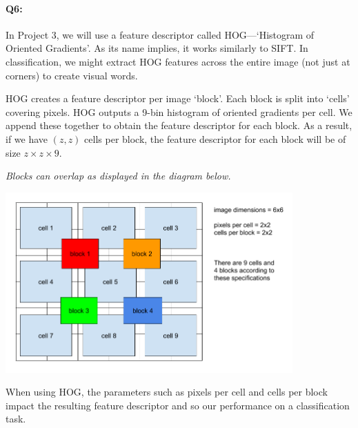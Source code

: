 \pagebreak

\paragraph{Q6:} In Project 3, we will use a feature descriptor called HOG---`Histogram of Oriented Gradients'. As its name implies, it works similarly to SIFT. In classification, we might extract HOG features across the entire image (not just at corners) to create visual words.

HOG creates a feature descriptor per image `block'. Each block is split into `cells' covering pixels. HOG outputs a 9-bin histogram of oriented gradients per cell. We append these together to obtain the feature descriptor for each block. As a result, if we have $(z,z)$ cells per block, the feature descriptor for each block will be of size $z \times z \times 9$.

\emph{Blocks can overlap as displayed in the diagram below.}
%
\begin{center}
    \includegraphics[clip,trim={0cm 0.75cm 0cm 0.75cm},width=11cm]{hog-diagram.png}
\end{center}
%
When using HOG, the parameters such as pixels per cell and cells per block impact the resulting feature descriptor and so our performance on a classification task.

